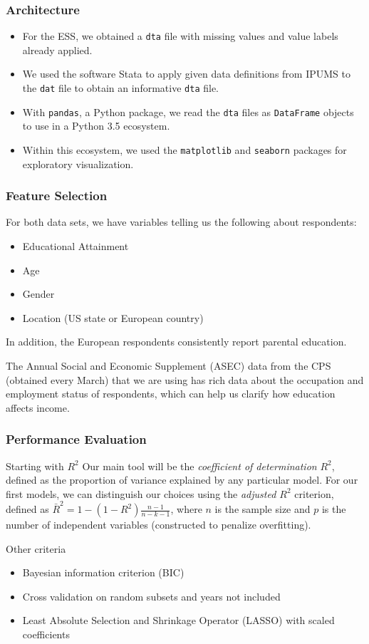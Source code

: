 \documentclass{beamer}
\let\olditem=\item
\renewcommand{\item}{\olditem \justifying}
\begin{document}
\frame %
{
  \frametitle{Architecture}
  \begin{itemize}
  \item For the ESS, we obtained a \texttt{dta} file with missing values and value labels already applied.
  \item We used the software Stata to apply given data definitions from IPUMS to the \texttt{dat} file to obtain an informative \texttt{dta} file.  
  \item With \texttt{pandas}, a Python package, we read the \texttt{dta} files as \texttt{DataFrame} objects to use in a Python 3.5 ecosystem. 
  \item Within this ecosystem, we used the \texttt{matplotlib} and \texttt{seaborn} packages for exploratory visualization.
  \end{itemize}
}

\frame %
{
  \frametitle{Feature Selection}
  For both data sets, we have variables telling us the following about respondents:
  \begin{itemize}
  \item Educational Attainment
  \item Age
  \item Gender
  \item Location (US state or European country) 
  \end{itemize}
  In addition, the European respondents consistently report parental education. 
  
  The Annual Social and Economic Supplement (ASEC) data from the CPS (obtained every March) that we are using has rich data about the occupation and employment status of respondents, which can help us clarify how education affects income.
}

\frame %
{
  \frametitle{Performance Evaluation}
  
  \begin{block}{Starting with $R^2$}
  Our main tool will be the \emph{coefficient of determination} $R^2$, defined as the proportion of variance explained by any particular model. For our first models, we can distinguish our choices using the \emph{adjusted $R^2$} criterion, defined as 
  $\bar{R}^2 = 1 - (1-R^2) \frac{n-1}{n-k-1}$, where $n$ is the sample size and $p$ is the number of independent variables (constructed to penalize overfitting). 
  \end{block}
  
  \begin{block}{Other criteria}
  \begin{itemize}
  \item Bayesian information criterion (BIC)
  \item Cross validation on random subsets and years not included
  \item Least Absolute Selection and Shrinkage Operator (LASSO) with scaled coefficients
  \end{itemize}
  \end{block}
  
  }
  
\end{document}
